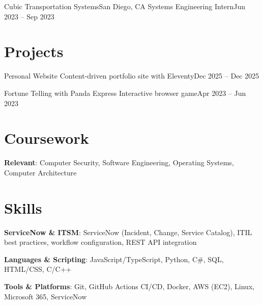 \documentclass[letterpaper,10pt]{article}
\begin{document}
    \resumeSubheading
      {Cubic Transportation Systems}{San Diego, CA}
      {Systems Engineering Intern}{Jun 2023 -- Sep 2023}
      \resumeItemListStart
      \resumeItemListEnd

  \resumeSubHeadingListEnd


\section{Projects}
  \resumeSubHeadingListStart

    \resumeSubheading
      {Personal Website}{}
      {Content-driven portfolio site with Eleventy}{Dec 2025 -- Dec 2025}
      \resumeItemListStart
      \resumeItemListEnd

    \resumeSubheading
      {Fortune Telling with Panda Express}{}
      {Interactive browser game}{Apr 2023 -- Jun 2023}
      \resumeItemListStart
      \resumeItemListEnd

  \resumeSubHeadingListEnd


\section{Coursework}
 \resumeSubHeadingListStart
   \item{
     \textbf{Relevant}{: Computer Security, Software Engineering, Operating Systems, Computer Architecture}
   }
 \resumeSubHeadingListEnd


\section{Skills}
 \resumeSubHeadingListStart
   \item{
     \textbf{ServiceNow \& ITSM}{: ServiceNow (Incident, Change, Service Catalog), ITIL best practices, workflow configuration, REST API integration}
   }
   \item{
     \textbf{Languages \& Scripting}{: JavaScript/TypeScript, Python, C\#, SQL, HTML/CSS, C/C++}
   }
   \item{
     \textbf{Tools \& Platforms}{: Git, GitHub Actions CI/CD, Docker, AWS (EC2), Linux, Microsoft 365, ServiceNow}
   }
 \resumeSubHeadingListEnd

\end{document}
